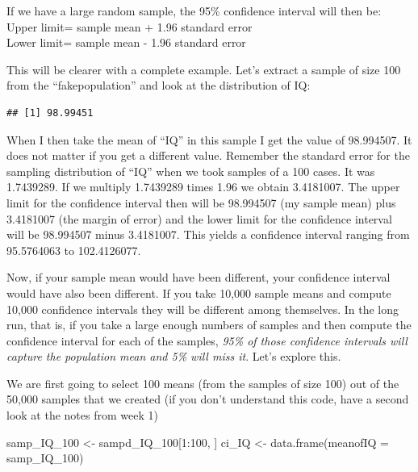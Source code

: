 \documentclass[
]{book}
\newenvironment{Shaded}{\begin{snugshade}}{\end{snugshade}}
\newcommand{\AttributeTok}[1]{\textcolor[rgb]{0.77,0.63,0.00}{#1}}
\newcommand{\DecValTok}[1]{\textcolor[rgb]{0.00,0.00,0.81}{#1}}
\newcommand{\FunctionTok}[1]{\textcolor[rgb]{0.00,0.00,0.00}{#1}}
\newcommand{\NormalTok}[1]{#1}
\newcommand{\OtherTok}[1]{\textcolor[rgb]{0.56,0.35,0.01}{#1}}
\newcommand{\SpecialCharTok}[1]{\textcolor[rgb]{0.00,0.00,0.00}{#1}}
\begin{document}
If we have a large random sample, the 95\% confidence interval will then be:\\
Upper limit= sample mean + 1.96 standard error\\
Lower limit= sample mean - 1.96 standard error

This will be clearer with a complete example. Let's extract a sample of size 100 from the ``fakepopulation'' and look at the distribution of IQ:

\begin{Shaded}
\end{Shaded}

\begin{verbatim}
## [1] 98.99451
\end{verbatim}

When I then take the mean of ``IQ'' in this sample I get the value of 98.994507. It does not matter if you get a different value. Remember the standard error for the sampling distribution of ``IQ'' when we took samples of a 100 cases. It was 1.7439289. If we multiply 1.7439289 times 1.96 we obtain 3.4181007. The upper limit for the confidence interval then will be 98.994507 (my sample mean) plus 3.4181007 (the margin of error) and the lower limit for the confidence interval will be 98.994507 minus 3.4181007. This yields a confidence interval ranging from 95.5764063 to 102.4126077.

Now, if your sample mean would have been different, your confidence interval would have also been different. If you take 10,000 sample means and compute 10,000 confidence intervals they will be different among themselves. In the long run, that is, if you take a large enough numbers of samples and then compute the confidence interval for each of the samples, \emph{95\% of those confidence intervals will capture the population mean and 5\% will miss it}. Let's explore this.

We are first going to select 100 means (from the samples of size 100) out of the 50,000 samples that we created (if you don't understand this code, have a second look at the notes from week 1)

\begin{Shaded}
\begin{Highlighting}[]
\NormalTok{samp\_IQ\_100 }\OtherTok{\textless{}{-}}\NormalTok{ sampd\_IQ\_100[}\DecValTok{1}\SpecialCharTok{:}\DecValTok{100}\NormalTok{, ]}
\NormalTok{ci\_IQ }\OtherTok{\textless{}{-}} \FunctionTok{data.frame}\NormalTok{(}\AttributeTok{meanofIQ =}\NormalTok{ samp\_IQ\_100)}
\end{Highlighting}
\end{Shaded}
\end{document}
